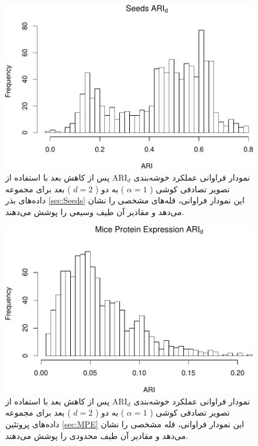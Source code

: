 \begin{figure}[H]
\centering
\includegraphics[width=0.7\linewidth]{Report_files/figure-latex/unnamed-chunk-9-5}
\caption{
نمودار فراوانی عملکرد خوشه‌بندی 
$\mathrm{ARI}_d$
پس از کاهش بعد با استفاده از تصویر تصادفی
کوشی (%
$\alpha=1$%
)
به دو (%
$d=2$%
)
بعد برای مجموعه داده‌های
بذر
\ref{sec:Seeds}
این نمودار فراوانی،
قله‌های
مشخصی را نشان 
می‌دهد
و مقادیر آن طیف 
وسیعی را پوشش می‌دهند.
}
\end{figure}


\begin{figure}[H]
\centering
\includegraphics[width=0.7\linewidth]{Report_files/figure-latex/unnamed-chunk-9-6}
\caption{
نمودار فراوانی عملکرد خوشه‌بندی 
$\mathrm{ARI}_d$
پس از کاهش بعد با استفاده از تصویر تصادفی
کوشی (%
$\alpha=1$%
)
به دو (%
$d=2$%
)
بعد برای مجموعه داده‌های
پروتئین
\ref{sec:MPE}
این نمودار فراوانی،
قله
مشخصی را نشان 
می‌دهد
و مقادیر آن طیف 
محدودی
 را پوشش می‌دهند.
}
\end{figure}


